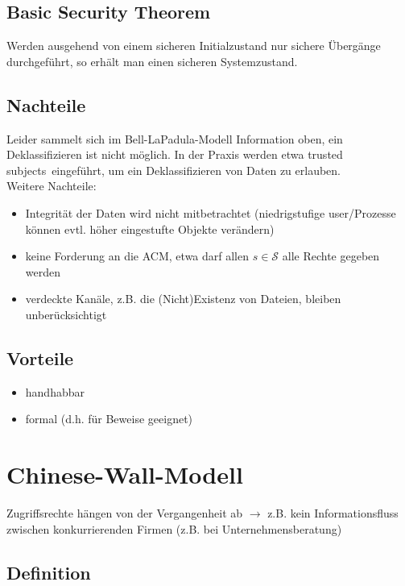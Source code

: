 \documentclass[a4paper,twoside,DIV15,BCOR12mm]{scrbook}
\begin{document}
\subsection{Basic Security Theorem}

Werden ausgehend von einem sicheren Initialzustand nur sichere Übergänge durchgeführt, so erhält man einen sicheren Systemzustand.

\subsection{Nachteile}

Leider sammelt sich im Bell-LaPadula-Modell Information \glqq oben\grqq, ein Deklassifizieren ist nicht möglich. In der Praxis werden etwa \glqq trusted subjects\grqq\ eingeführt, um ein Deklassifizieren von Daten zu erlauben.\\

Weitere Nachteile:

\begin{itemize}
	\item Integrität der Daten wird nicht mitbetrachtet (niedrigstufige user/Prozesse können evtl. höher eingestufte Objekte verändern)
	\item keine Forderung an die ACM, etwa darf allen $s \in \mathcal{S}$ alle Rechte gegeben werden
	\item verdeckte Kanäle, z.B. die (Nicht)Existenz von Dateien, bleiben unberücksichtigt
\end{itemize}

\subsection{Vorteile}

\begin{itemize}
	\item handhabbar
	\item formal (d.h. für Beweise geeignet)
\end{itemize}

\section{Chinese-Wall-Modell}

Zugriffsrechte hängen von der Vergangenheit ab $\rightarrow$ z.B. kein Informationsfluss zwischen konkurrierenden Firmen (z.B. bei Unternehmensberatung)

\subsection{Definition}
\end{document}
